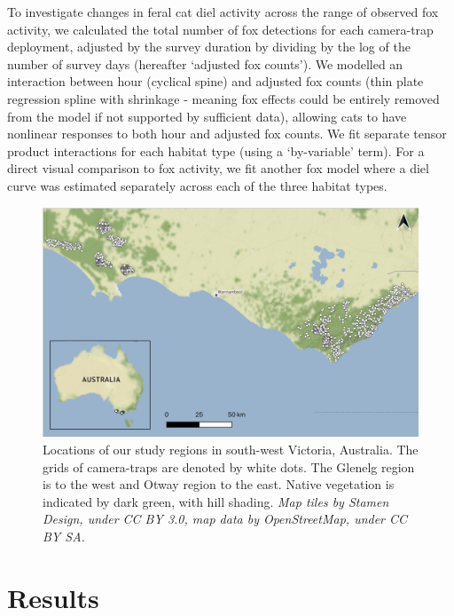 \documentclass[11pt,a4paper,titlepage,twoside,openright]{style/unimelbthesis}
\begin{document}
\begin{mainmatter}
To investigate changes in feral cat diel activity across the range of observed fox activity, we calculated the total number of fox detections for each camera-trap deployment, adjusted by the survey duration by dividing by the log of the number of survey days (hereafter `adjusted fox counts'). We modelled an interaction between hour (cyclical spine) and adjusted fox counts (thin plate regression spline with shrinkage - meaning fox effects could be entirely removed from the model if not supported by sufficient data), allowing cats to have nonlinear responses to both hour and adjusted fox counts. We fit separate tensor product interactions for each habitat type (using a `by-variable' term). For a direct visual comparison to fox activity, we fit another fox model where a diel curve was estimated separately across each of the three habitat types.

\newpage
\begin{figure}

{\centering \includegraphics[width=1\linewidth]{figure/map_cams} 

}

\caption{Locations of our study regions in south-west Victoria, Australia. The grids of camera-traps are denoted by white dots. The Glenelg region is to the west and Otway region to the east. Native vegetation is indicated by dark green, with hill shading. \textit{Map tiles by Stamen Design, under CC BY 3.0, map data by OpenStreetMap, under CC BY SA.}}\label{fig:diel-map}
\end{figure}
\newpage

\hypertarget{results-3}{%
\section{Results}\label{results-3}}


\end{mainmatter}
\end{document}

